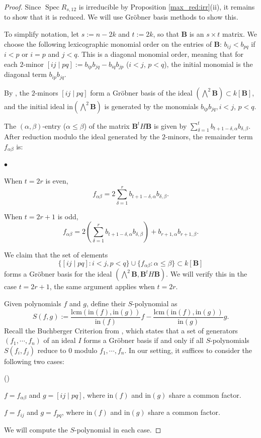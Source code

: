 \documentclass[pdflatex,sn-mathphys-num]{sn-jnl}%
\theoremstyle{thmstyleone}%
\theoremstyle{thmstyletwo}%
\numberwithin{equation}{subsection}
\theoremstyle{thmstylethree}%
\newcommand{\bB}{\ensuremath{\mathbf{B}}\xspace}
\DeclareMathOperator{\Spec}{Spec}
\newcommand{\ini}{\text{in}}
\newcommand{\lcm}{\text{lcm}}
\newenvironment{altenumerate2}
	{\begin{list}
			{\textup{(\theenumii)} }
			{\usecounter{enumii}
				\setlength{\labelwidth}{0pt}
				\setlength{\labelsep}{0pt}
				\setlength{\leftmargin}{2em}
				\setlength{\itemsep}{\the\smallskipamount}
				\renewcommand{\theenumii}{\alph{enumii}}
		}}
		{\end{list}}
\newenvironment{altitemize}
	{\begin{list}
			{$\bullet$}
			{\setlength{\labelwidth}{0pt}
				\setlength{\itemindent}{5pt}
				\setlength{\labelsep}{5pt}
				\setlength{\leftmargin}{0pt}
				\setlength{\itemsep}{\the\smallskipamount}
		}}
		{\end{list}}
\begin{document}
\begin{proof}
Since $\Spec R_{s,12}$ is irreducible by Proposition \ref{max_red:irr}(ii), it remains to show that it is reduced.
We will use Gr\"obner basis methods to show this.

To simplify notation, let $s:=n-2k$ and $t:=2k$, so that $\bB$ is an $s\times t$ matrix.
We choose the following lexicographic monomial order on the entries of $\bB$: $b_{ij}<b_{pq}$ if $i<p$ or $i=p$ and $j<q$. This is a diagonal monomial order, meaning that for each $2$-minor $[ij\mid pq]:=b_{ip}b_{jq}-b_{iq}b_{jp}$ ($i<j$, $p<q$), the initial monomial is the diagonal term $b_{ip}b_{jq}$.

By \cite[Theorem 4.1.1]{BCRV2022}, the $2$-minors $[ij\mid pq]$ form a Gr\"obner basis of the ideal $(\bigwedge^2 \bB)\subset k[\bB]$, and the initial ideal $\text{in}(\bigwedge^2\bB)$ is generated by the monomials $b_{ip}b_{jq}, i<j$, $p<q$.

The $(\alpha,\beta)$-entry ($\alpha\leq \beta$) of the matrix $\bB^tH\bB$ is given by $\sum_{\delta=1}^t b_{t+1-\delta,\alpha}b_{\delta,\beta}$. 
After reduction modulo the ideal generated by the $2$-minors, the remainder term $f_{\alpha\beta}$ is:
\begin{altitemize}
\item When $t=2r$ is even,
\begin{equation*}
    f_{\alpha\beta}=2\sum_{\delta=1}^r b_{t+1-\delta,\alpha}b_{\delta,\beta}.
\end{equation*}
\item When $t=2r+1$ is odd, 
\begin{equation*}
    f_{\alpha\beta}=2\left(\sum_{\delta=1}^r b_{t+1-\delta,\alpha}b_{\delta,\beta}\right)+b_{r+1,\alpha}b_{r+1,\beta}.
\end{equation*}
\end{altitemize}


We claim that the set of elements 
$$\{[ij\mid pq]:i<j,p<q\}\cup\{f_{\alpha\beta}:\alpha\leq \beta\}\subset k[\bB]$$
forms a Gr\"obner basis for the ideal $\left(\bigwedge^2\bB,\bB^tH\bB\right)$.
We will verify this in the case $t=2r+1$, the same argument applies when $t=2r$.

Given polynomials $f$ and $g$, define their $S$-polynomial as
\begin{equation*}
    S(f,g):=\frac{\lcm(\ini(f),\ini(g))}{\ini(f)}f-\frac{\lcm(\ini(f),\ini(g))}{\ini(g)}g.
\end{equation*}
Recall the Buchberger Criterion from \cite[Theorem 1.2.13]{BCRV2022}, which states that a set of generators $(f_1,\cdots,f_n)$ of an ideal $I$ forms a Gr\"obner basis if and only if all $S$-polynomials $S(f_i,f_j)$ reduce to $0$ modulo $f_1,\cdots,f_n$.
In our setting, it suffices to consider the following two cases:
\begin{altenumerate2}
\item $f=f_{\alpha\beta}$ and $g=[ij\mid pq]$, where $\ini(f)$ and $\ini(g)$ share a  common factor.
\item $f=f_{ij}$ and $g=f_{pq}$, where $\ini(f)$ and $\ini(g)$ share a common factor.
\end{altenumerate2}
We will compute the $S$-polynomial in each case.


\end{proof}
\end{document}
